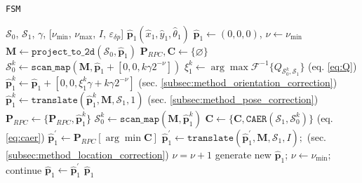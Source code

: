 \begin{algorithm}
  \caption{\texttt{FSM}}
  \begin{spacing}{1.2}
  \begin{algorithmic}[1]
    \REQUIRE $\mathcal{S}_0$, $\mathcal{S}_1$, $\gamma$, [$\nu_{\min}$, $\nu_{\max}$, $I$, $\varepsilon_{\delta p}$]
    \ENSURE $\hat{\bm{p}}_1(\hat{x}_1, \hat{y}_1, \hat{\theta}_1)$
    \STATE $\hat{\bm{p}}_1 \leftarrow (0,0,0)$, $\nu \leftarrow \nu_{\min}$
    \STATE $\bm{M} \leftarrow \texttt{project\_to\_2d}(\mathcal{S}_0, \hat{\bm{p}}_1)$
    \WHILE{$\nu \leq \nu_{\max}$}
      \STATE $\bm{P}_{RPC},  \bm{C} \leftarrow \{\varnothing\}$
        \STATE $\mathcal{S}_0^k \leftarrow \texttt{scan\_map}(\bm{M}, \hat{\bm{p}}_1 + [0,0,k \gamma 2^{-\nu}])$
        \STATE $\xi_1^k \leftarrow \arg\max \mathcal{F}^{-1}\{Q_{\mathcal{S}_0^k, \mathcal{S}_1}\}$ \hfill (eq. \ref{eq:Q})
        \STATE $\hat{\bm{p}}_1^k \leftarrow \hat{\bm{p}}_1 + [0,0, \xi_1^k \gamma + k \gamma 2^{-\nu}]$ \hfill (sec. \ref{subsec:method_orientation_correction})
        \STATE $\hat{\bm{p}}_1^{k} \leftarrow \texttt{translate}(\hat{\bm{p}}_1^k, \bm{M}, \mathcal{S}_1, 1)$ \hfill (sec. \ref{subsec:method_pose_correction})
        \STATE $\bm{P}_{RPC} \leftarrow \{\bm{P}_{RPC}, \hat{\bm{p}}_1^{k}\}$
        \STATE $\mathcal{S}_0^k \leftarrow \texttt{scan\_map}(\bm{M},\hat{\bm{p}}_1^{k})$
        \STATE $\bm{C} \leftarrow \{\bm{C}, \texttt{CAER}(\mathcal{S}_1, \mathcal{S}_0^k)\}$ \hfill (eq. \ref{eq:caer})
      \ENDFOR
      \STATE $\hat{\bm{p}}_1^\prime \leftarrow \bm{P}_{RPC}[\arg\min \bm{C}]$
      \STATE $\hat{\bm{p}}_1^\prime \leftarrow \texttt{translate}(\hat{\bm{p}}_1^\prime, \bm{M}, \mathcal{S}_1, I);$  \hfill (sec. \ref{subsec:method_location_correction})
        \STATE $\nu = \nu + 1$
      \ENDIF
        \STATE generate new $\hat{\bm{p}}_1$; $\nu \leftarrow \nu_{\min}$; continue
      \ENDIF
      \STATE $\hat{\bm{p}}_1 \leftarrow \hat{\bm{p}}_1^\prime$
    \ENDWHILE
    \RETURN $\hat{\bm{p}}_1$
  \end{algorithmic}
  \end{spacing}
  \label{alg:algorithm_fsm}
\end{algorithm}

